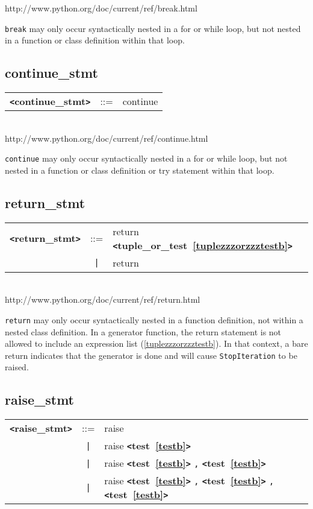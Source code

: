 \documentclass[12pt]{article}
\begin{document}
http://www.python.org/doc/current/ref/break.html

\verb+break+ may only occur syntactically nested in a for or while loop, 
but not nested in a function or class definition within that loop.   

\subsection{continue\_stmt}
\label{continuezzzstmtb}
\begin{tabular}{lcl}
{\bf \verb+<+continue\_stmt\verb+>+} & ::=  & continue \\
\end{tabular} \\

http://www.python.org/doc/current/ref/continue.html

\verb|continue| may only occur syntactically nested in a for or while loop, 
but not nested in a function or class definition or try statement within 
that loop.

\subsection{return\_stmt}
\label{returnzzzstmtb}
\begin{tabular}{lcl}
{\bf \verb+<+return\_stmt\verb+>+} & ::=  & return {\bf \verb+<+tuple\_or\_test~\ref{tuplezzzorzzztestb}\verb+>+}  \\
 & \verb+|+  & return \\
\end{tabular} \\

http://www.python.org/doc/current/ref/return.html

\verb|return| may only occur syntactically nested in a function definition, 
not within a nested class definition.  In a generator function, 
the return statement is not allowed to include an expression list (\ref{tuplezzzorzzztestb}). In that context, a bare return indicates that the generator is done and will cause \verb|StopIteration| to be raised. 

\subsection{raise\_stmt}
\label{raisezzzstmtb}
\begin{tabular}{lcl}
{\bf \verb+<+raise\_stmt\verb+>+} & ::=  & raise \\
 & \verb+|+  & raise {\bf \verb+<+test~\ref{testb}\verb+>+}  \\
 & \verb+|+  & raise {\bf \verb+<+test~\ref{testb}\verb+>+}  \verb|,| {\bf \verb+<+test~\ref{testb}\verb+>+}  \\
 & \verb+|+  & raise {\bf \verb+<+test~\ref{testb}\verb+>+}  \verb|,| {\bf \verb+<+test~\ref{testb}\verb+>+}  \verb|,| {\bf \verb+<+test~\ref{testb}\verb+>+}  \\
\end{tabular} \\
\end{document}
